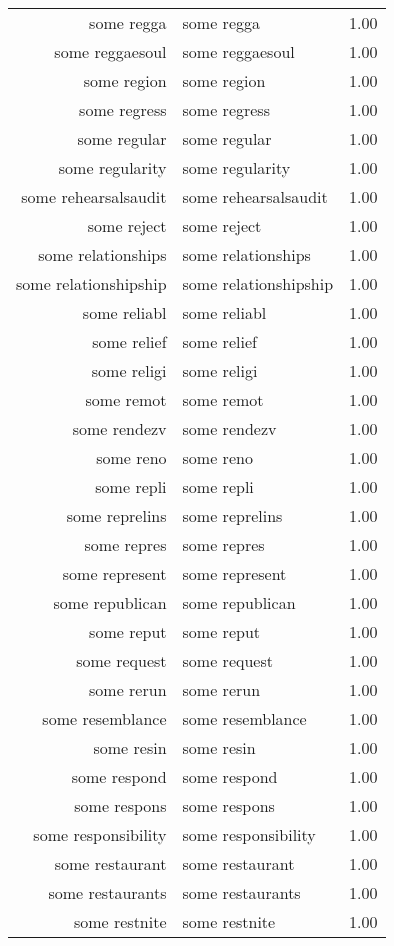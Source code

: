 \begin{table}[ht]
\begin{tabular}{rlr}
  some regga & some regga & 1.00 \\ 
  some reggaesoul & some reggaesoul & 1.00 \\ 
  some region & some region & 1.00 \\ 
  some regress & some regress & 1.00 \\ 
  some regular & some regular & 1.00 \\ 
  some regularity & some regularity & 1.00 \\ 
  some rehearsalsaudit & some rehearsalsaudit & 1.00 \\ 
  some reject & some reject & 1.00 \\ 
  some relationships & some relationships & 1.00 \\ 
  some relationshipship & some relationshipship & 1.00 \\ 
  some reliabl & some reliabl & 1.00 \\ 
  some relief & some relief & 1.00 \\ 
  some religi & some religi & 1.00 \\ 
  some remot & some remot & 1.00 \\ 
  some rendezv & some rendezv & 1.00 \\ 
  some reno & some reno & 1.00 \\ 
  some repli & some repli & 1.00 \\ 
  some reprelins & some reprelins & 1.00 \\ 
  some repres & some repres & 1.00 \\ 
  some represent & some represent & 1.00 \\ 
  some republican & some republican & 1.00 \\ 
  some reput & some reput & 1.00 \\ 
  some request & some request & 1.00 \\ 
  some rerun & some rerun & 1.00 \\ 
  some resemblance & some resemblance & 1.00 \\ 
  some resin & some resin & 1.00 \\ 
  some respond & some respond & 1.00 \\ 
  some respons & some respons & 1.00 \\ 
  some responsibility & some responsibility & 1.00 \\ 
  some restaurant & some restaurant & 1.00 \\ 
  some restaurants & some restaurants & 1.00 \\ 
  some restnite & some restnite & 1.00 \\ 

\end{tabular}
\end{table}
